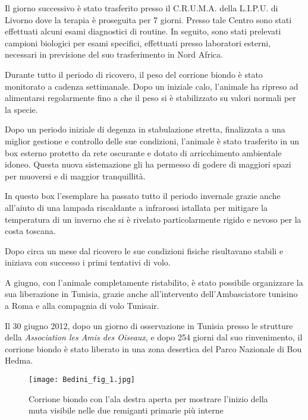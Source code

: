 Il giorno successivo \`e stato trasferito presso il C.R.U.M.A. della
L.I.P.U. di Livorno dove la terapia \`e proseguita per 7 giorni. Presso
tale Centro sono stati effettuati alcuni esami diagnostici di routine.
In seguito, sono stati prelevati campioni biologici per esami
specifici, effettuati presso laboratori esterni, necessari in
previsione del suo trasferimento in Nord Africa. 

Durante tutto il periodo di ricovero, il peso del corrione biondo \`e
stato monitorato a cadenza settimanale. Dopo un iniziale calo,
l{\textquoteright}animale ha ripreso ad alimentarsi regolarmente fino a
che il peso si \`e stabilizzato su valori normali per la specie.

Dopo un periodo iniziale di degenza in stabulazione stretta, finalizzata
a una miglior gestione e controllo delle sue condizioni,
l{\textquoteright}animale \`e stato trasferito in un box esterno
protetto da rete oscurante e dotato di arricchimento ambientale idoneo.
Questa nuova sistemazione gli ha permesso di godere di maggiori spazi
per muoversi e di maggior tranquillit\`a. 

In questo box l{\textquoteright}esemplare ha passato tutto il periodo
invernale grazie anche all{\textquoteright}aiuto di una lampada
riscaldante a infrarossi istallata per mitigare la temperatura di un
inverno che si \`e rivelato particolarmente rigido e nevoso per la
costa toscana.

Dopo circa un mese dal ricovero le sue condizioni fisiche risultavano
stabili e iniziava con successo i primi tentativi di volo.

A giugno, con l{\textquoteright}animale completamente ristabilito, \`e
stato possibile organizzare la sua liberazione in Tunisia, grazie anche
all{\textquoteright}intervento dell{\textquoteright}Ambasciatore
tunisino a Roma e alla compagnia di volo Tunisair.

Il 30 giugno 2012, dopo un giorno di osservazione in Tunisia presso le
strutture della \textit{Association  les Amis des Oiseaux}, e dopo 254
giorni dal suo rinvenimento, il corrione biondo \`e stato liberato in
una zona desertica del Parco Nazionale di Bou Hedma.

\begin{figure}[!h]
\centering
\texttt{[image: Bedini\_fig\_1.jpg]}
\caption{Corrione biondo con l{\textquoteright}ala destra aperta per mostrare l{\textquoteright}inizio della muta visibile nelle due remiganti primarie pi\`u interne}
\label{Bedini_fig_1}
\end{figure}

